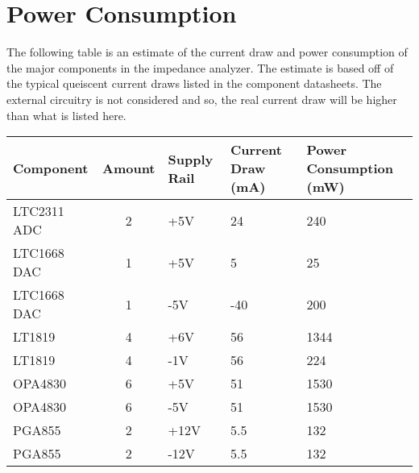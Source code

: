 \chapter{Power Consumption} \label{App:PowerConsumption}

The following table  is an estimate of the current draw and power consumption of the major components in the impedance analyzer.
The estimate is based off of the typical queiscent current draws listed in the component datasheets. The external circuitry is not considered and so, the real current draw will be higher than what is listed here.

        \begin{table}[ht]
            \centering
            \begin{tabular}{@{}lcp{1.5cm}p{1.8cm}p{2cm}@{}}
            \toprule
            \textbf{Component}       & \textbf{Amount} & \textbf{Supply Rail} & \textbf{Current Draw (mA)} & \textbf{Power Consumption (mW)} \\ \midrule
            LTC2311 ADC              & 2               & +5V                  & 24                         & 240                              \\
            LTC1668 DAC              & 1               & +5V                  & 5                          & 25                               \\
            LTC1668 DAC              & 1               & -5V                  & -40                        & 200                              \\
            LT1819                   & 4               & +6V                  & 56                         & 1344                             \\
            LT1819                   & 4               & -1V                  & 56                         & 224                              \\
            OPA4830                  & 6               & +5V                  & 51                         & 1530                             \\
            OPA4830                  & 6               & -5V                  & 51                         & 1530                             \\
            PGA855                   & 2               & +12V                 & 5.5                        & 132                              \\
            PGA855                   & 2               & -12V                 & 5.5                        & 132                              \\

\end{tabular}
\end{table}
